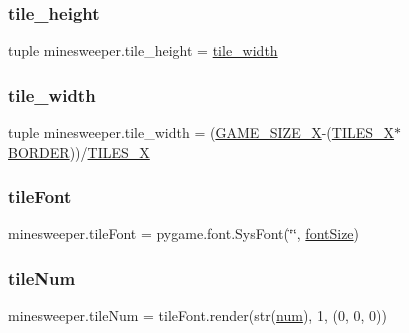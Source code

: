 \mbox{\label{namespaceminesweeper_a033197bb6aa4149287e9c4fcdeff7d96}} 
\subsubsection{\texorpdfstring{tile\_height}{tile\_height}}
{\footnotesize\ttfamily tuple minesweeper.\+tile\+\_\+height = \mbox{\hyperlink{namespaceminesweeper_a528cb94bc9f0e9a64f2923e0414591ed}{tile\+\_\+width}}}

\mbox{\label{namespaceminesweeper_a528cb94bc9f0e9a64f2923e0414591ed}} 
\subsubsection{\texorpdfstring{tile\_width}{tile\_width}}
{\footnotesize\ttfamily tuple minesweeper.\+tile\+\_\+width = (\mbox{\hyperlink{namespaceminesweeper_a46d8139d06a5719868fc00cba651c8ff}{G\+A\+M\+E\+\_\+\+S\+I\+Z\+E\+\_\+X}}-\/(\mbox{\hyperlink{namespaceminesweeper_ac9707e38bc10ae8def8674e284754df2}{T\+I\+L\+E\+S\+\_\+X}}$\ast$\mbox{\hyperlink{namespaceminesweeper_a3324cf634218bea0300a16ea394866bf}{B\+O\+R\+D\+ER}}))/\mbox{\hyperlink{namespaceminesweeper_ac9707e38bc10ae8def8674e284754df2}{T\+I\+L\+E\+S\+\_\+X}}}

\mbox{\label{namespaceminesweeper_a57a5c5cbc70cec16f2dc0c2b524ec53b}} 
\subsubsection{\texorpdfstring{tileFont}{tileFont}}
{\footnotesize\ttfamily minesweeper.\+tile\+Font = pygame.\+font.\+Sys\+Font(\char`\"{}\char`\"{}, \mbox{\hyperlink{namespaceminesweeper_a8d7e0edcef8465377296847bc7110ada}{font\+Size}})}

\mbox{\label{namespaceminesweeper_aabb074303bb202fba9d36dfa9803a877}} 
\subsubsection{\texorpdfstring{tileNum}{tileNum}}
{\footnotesize\ttfamily minesweeper.\+tile\+Num = tile\+Font.\+render(str(\mbox{\hyperlink{namespaceminesweeper_ab98a5a8f716307b1802794c8b8531461}{num}}), 1, (0, 0, 0))}


